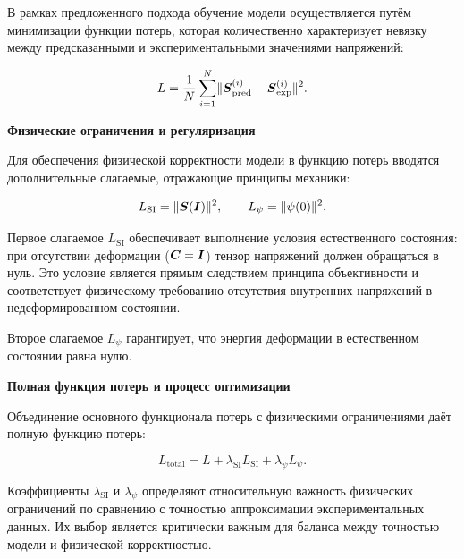 В рамках предложенного подхода обучение модели осуществляется путём минимизации функции потерь, 
которая количественно характеризует невязку между предсказанными и экспериментальными значениями напряжений:

\begin{equation}
 L = \frac{1}{N}\sum_{i=1}^N \lVert \boldsymbol{S}^{(i)}_{\text{pred}} - \boldsymbol{S}^{(i)}_{\text{exp}} \rVert^2.
\label{eq:main_loss_function}
\end{equation}


\textbf{Физические ограничения и регуляризация}

Для обеспечения физической корректности модели в функцию потерь вводятся дополнительные слагаемые, 
отражающие принципы механики:

\begin{equation}
 L_{\text{SI}} = \lVert \boldsymbol{S}(\boldsymbol{I})\rVert^2,\qquad L_{\psi}=\lVert\psi(0)\rVert^2.
\label{eq:physical_constraints}
\end{equation}

Первое слагаемое $L_{\text{SI}}$ обеспечивает выполнение условия естественного состояния: 
при отсутствии деформации ($\boldsymbol{C} = \boldsymbol{I}$) тензор напряжений должен обращаться в нуль. 
Это условие является прямым следствием принципа объективности и соответствует физическому требованию 
отсутствия внутренних напряжений в недеформированном состоянии.

Второе слагаемое $L_{\psi}$ гарантирует, что энергия деформации в естественном состоянии равна нулю.

\textbf{Полная функция потерь и процесс оптимизации}

Объединение основного функционала потерь с физическими ограничениями даёт полную функцию потерь:

\begin{equation}
 L_{\text{total}} = L + \lambda_{\text{SI}} L_{\text{SI}} + \lambda_{\psi} L_{\psi}.
\label{eq:total_loss_function}
\end{equation}

Коэффициенты $\lambda_{\text{SI}}$ и $\lambda_{\psi}$ определяют относительную важность физических ограничений 
по сравнению с точностью аппроксимации экспериментальных данных. 
Их выбор является критически важным для баланса между точностью модели и физической корректностью.

